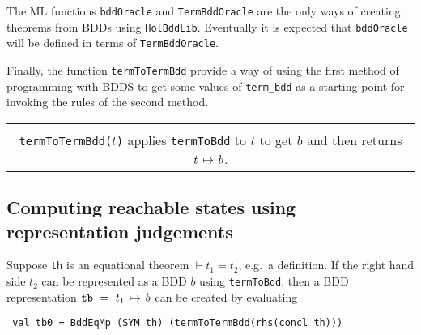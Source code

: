 \documentclass[12pt]{article}
\newcommand{\bnind}[1]{\index[MLbn]{#1}}
\newlength{\minipagewidth}
\newcommand{\ty}[1]{\mbox{\tt #1}}
\newcommand{\ml}[1]{{\tt #1}}
\newcommand{\globtermbdd}[2]{\mbox{$#1\hspace{0.5mm}\mapsto\hspace{0.5mm}#2$}}
\newcommand\termbddty{\ty{term\_bdd}}
\newcommand\fun{\mbox{\tt{->}}}
\begin{document}
The ML functions \ml{bddOracle} and \ml{TermBddOracle} are the only
ways of creating theorems from BDDs using \ml{HolBddLib}. Eventually
it is expected that \ml{bddOracle} will be defined in terms of
\ml{TermBddOracle}.

Finally, the function \ml{termToTermBdd} provide a way of using the first
method of programming with BDDS to get some values of \termbddty{} as a starting
point for invoking the rules of the second method.


\vspace*{-4mm}
\begin{flushleft}
\begin{tabular}{|c|}\hline
\begin{minipage}{\minipagewidth}
\smallskip
\begin{footnotesize}
\begin{description}

\item
$\ml{termToTermBdd}\bnind{\ml{termToTermBdd}}:\ty{term}\fun\termbddty$\\
\ml{termToTermBdd($t$)} applies \ml{termToBdd} to $t$ to get
$b$ and then returns $\globtermbdd{t}{b}$.


\end{description}
\end{footnotesize}
\smallskip
\end{minipage}\\ \hline
\end{tabular}
\end{flushleft}


\subsection{Computing reachable states using representation judgements}\label{reach2}

Suppose \ml{th} is an equational theorem $\vdash t_1=t_2$, e.g.~a definition.
If the right hand side $t_2$ can be represented as a BDD $b$ using
\ml{termToBdd}, then a BDD representation $\ml{tb}~=~\globtermbdd{t_1}{b}$
can be created by evaluating

\vspace*{-1mm}

\begin{verbatim}
 val tb0 = BddEqMp (SYM th) (termToTermBdd(rhs(concl th)))
\end{verbatim}
\end{document}
